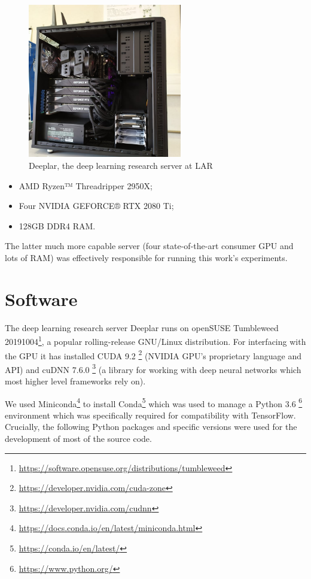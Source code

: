 \begin{figure}[ht]
    \centering
    \includegraphics[width=0.6\textwidth]{figs/deeplar.jpg}
    \caption{Deeplar, the deep learning research server at \ac{LAR}}
    \label{fig:deeplar}
\end{figure}

\begin{itemize}
    \item AMD Ryzen™ Threadripper 2950X;
    \item Four NVIDIA GEFORCE® RTX 2080 Ti;
    \item 128GB DDR4 RAM.
\end{itemize}

The latter much more capable server (four state-of-the-art consumer \ac{GPU} and lots of \ac{RAM}) was effectively responsible for running this work's experiments.

\section{Software}

The deep learning research server Deeplar runs on openSUSE Tumbleweed 20191004\footnote{\url{https://software.opensuse.org/distributions/tumbleweed}}, a popular rolling-release GNU/Linux distribution. For interfacing with the \ac{GPU} it has installed CUDA 9.2 \footnote{\url{https://developer.nvidia.com/cuda-zone}} (NVIDIA GPU's proprietary language and API) and cuDNN 7.6.0 \footnote{\url{https://developer.nvidia.com/cudnn}} (a library for working with deep neural networks which most higher level frameworks rely on).

We used Miniconda\footnote{\url{https://docs.conda.io/en/latest/miniconda.html}} to install Conda\footnote{\url{https://conda.io/en/latest/}} which was used to manage a Python 3.6 \footnote{\url{https://www.python.org/}} environment which was specifically required for compatibility with TensorFlow. Crucially, the following Python packages and specific versions were used for the development of most of the source code.

